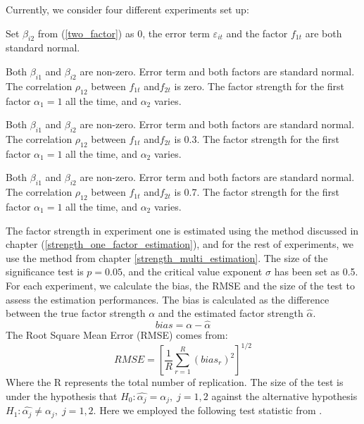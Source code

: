 Currently, we consider four different experiments set up:

\begin{experiment}
Set $\beta_{i2}$ from (\ref{two_factor}) as 0, the error term $\varepsilon_{it}$ and the factor $f_{1t}$ are both standard normal.
\end{experiment}

\begin{experiment}
Both $\beta_{i1}$ and $\beta_{i2}$ are non-zero. Error term and both factors are standard normal. The correlation $\rho_{12}$ between $f_{1t}$ and$f_{2t}$ is zero. 
The factor strength for the first factor $\alpha_1 = 1$ all the time, and $\alpha_2$ varies.
\end{experiment}

\begin{experiment}
Both $\beta_{i1}$ and $\beta_{i2}$ are non-zero. Error term  and both factors are standard normal. The correlation $\rho_{12}$ between $f_{1t}$ and$f_{2t}$ is 0.3.
The factor strength for the first factor $\alpha_1 = 1$ all the time, and $\alpha_2$ varies.
\end{experiment}

\begin{experiment}
	Both $\beta_{i1}$ and $\beta_{i2}$ are non-zero. Error term and both factors are standard normal. The correlation $\rho_{12}$ between $f_{1t}$ and$f_{2t}$ is 0.7.
	The factor strength for the first factor $\alpha_1 = 1$ all the time, and $\alpha_2$ varies.
\end{experiment}

The factor strength in experiment one is estimated using the method discussed in chapter (\ref{strength_one_factor_estimation}), and for the rest of experiments, we use the method from chapter \ref{strength_multi_estimation}.
The size of the significance test is $p = 0.05$, and the critical value exponent $\sigma$ has been set as 0.5.
For each experiment, we calculate the bias, the RMSE and the size of the test to assess the estimation performances.
The bias is calculated as the difference between the true factor strength $\alpha$ and the estimated factor strength $\hat{\alpha}$.
\[bias = \alpha - \hat{\alpha}\]
The Root Square Mean Error (RMSE) comes from:
\[ RMSE =[\frac{1}{R}\sum_{r=1}^{R}(bias_r)^2 ]^{1/2}\]
Where the R represents the total number of replication.
The size of the test is under the hypothesis that $H_0: \hat{\alpha_j} = \alpha_j,\;j =1, 2$ against the alternative hypothesis $H_1:\hat{\alpha_j} \neq \alpha_j,\; j=1,2$.
Here we employed the following test statistic from .

